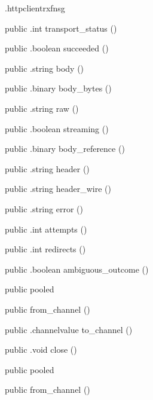 \begin{CrexxClass}{.httpclient}{rxfnsg}
\begin{Members}
    \Method
      {public}
      {.int}
      {transport\_status}
      {()}

    \Method
      {public}
      {.boolean}
      {succeeded}
      {()}

    \Method
      {public}
      {.string}
      {body}
      {()}

    \Method
      {public}
      {.binary}
      {body\_bytes}
      {()}

    \Method
      {public}
      {.string}
      {raw}
      {()}

    \Method
      {public}
      {.boolean}
      {streaming}
      {()}

    \Method
      {public}
      {.binary}
      {body\_reference}
      {()}

    \Method
      {public}
      {.string}
      {header}
      {()}

    \Method
      {public}
      {.string}
      {header\_wire}
      {()}

    \Method
      {public}
      {.string}
      {error}
      {()}

    \Method
      {public}
      {.int}
      {attempts}
      {()}

    \Method
      {public}
      {.int}
      {redirects}
      {()}

    \Method
      {public}
      {.boolean}
      {ambiguous\_outcome}
      {()}

    \Factory
      {public}
      {pooled}
      {}

    \Factory
      {public}
      {from\_channel}
      {()}

    \Method
      {public}
      {.channelvalue}
      {to\_channel}
      {()}

    \Method
      {public}
      {.void}
      {close}
      {()}

    \Factory
      {public}
      {pooled}
      {}

    \Factory
      {public}
      {from\_channel}
      {()}


\end{Members}
\end{CrexxClass}
